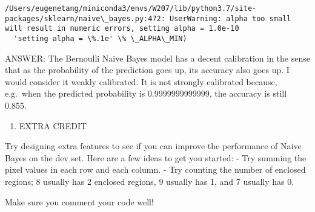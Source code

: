 \documentclass[11pt]{article}
\providecommand{\tightlist}{%
      \setlength{\itemsep}{0pt}\setlength{\parskip}{0pt}}
\begin{document}
    \begin{Verbatim}[commandchars=\\\{\}]
/Users/eugenetang/miniconda3/envs/W207/lib/python3.7/site-packages/sklearn/naive\_bayes.py:472: UserWarning: alpha too small will result in numeric errors, setting alpha = 1.0e-10
  'setting alpha = \%.1e' \% \_ALPHA\_MIN)

    \end{Verbatim}

    ANSWER: The Bernoulli Naive Bayes model has a decent calibration in the
sense that as the probability of the prediction goes up, its accuracy
also goes up. I would consider it weakly calibrated. It is not strongly
calibrated because, e.g.~when the predicted probability is
0.9999999999999, the accuracy is still 0.855.

    \begin{enumerate}
\def\labelenumi{(\arabic{enumi})}
\setcounter{enumi}{11}
\tightlist
\item
  EXTRA CREDIT
\end{enumerate}

Try designing extra features to see if you can improve the performance
of Naive Bayes on the dev set. Here are a few ideas to get you started:
- Try summing the pixel values in each row and each column. - Try
counting the number of enclosed regions; 8 usually has 2 enclosed
regions, 9 usually has 1, and 7 usually has 0.

Make sure you comment your code well!
\end{document}
